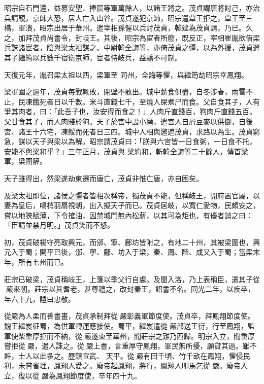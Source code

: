 \begin{pinyinscope}
 昭宗自石門還，益募安聖、捧宸等軍萬餘人，以諸王將之。茂貞謂唐將討己，亦治兵請覲，京師大恐，居人亡入山谷。茂貞遂犯京師，昭宗遣覃王拒之，覃王至三橋，軍潰，昭宗出居于華州。遣宰相孫偓以兵討茂貞，韓建為茂貞請，乃已。久之，加拜茂貞尚書令，封岐王。其後，昭宗為宦者所廢，既反正，宰相崔胤欲借梁兵誅諸宦者，陰與梁太祖謀之。中尉韓全誨等，亦倚茂貞之彊，以為外援，茂貞遣其子繼筠以兵數千宿衛京師，宦者恃岐兵，益驕不可制。



 天復元年，胤召梁太祖以西，梁軍至
 同州，全誨等懼，與繼筠劫昭宗幸鳳翔。



 梁軍圍之逾年，茂貞每戰輒敗，閉壁不敢出。城中薪食俱盡，自冬涉春，雨雪不止，民凍餓死者日以千數。米斗直錢七千，至燒人屎煮尸而食。父自食其子，人有爭其肉者，曰：「此吾子也，汝安得而食之！」人肉斤直錢百，狗肉斤直錢五百。父甘食其子，而人肉賤於狗。天子於宮中設小磨，遣宮人自屑豆麥以供御，自後宮、諸王十六宅，凍餒而死者日三四。城中人相與邀遮茂貞，求路以為生。茂貞窮急，謀以天子與梁以為解。昭宗謂茂貞曰：「朕與六宮皆一日食粥，一日食不托，安能不與梁和乎？」三年正月，茂貞與
 梁約和，斬韓全誨等二十餘人，傳首梁軍，梁圍解。



 天子雖得出，然梁遂劫東遷而唐亡，茂貞非惟亡唐，亦自困矣。



 及梁太祖即位，諸侯之彊者皆相次稱帝，獨茂貞不能，但稱岐王，開府置官屬，以妻為皇后，鳴梢羽扇視朝，出入擬天子而已。茂貞居岐，以寬仁愛物，民頗安之，嘗以地狹賦薄，下令搉油，因禁城門無內松薪，以其可為炬也，有優者誚之曰：「臣請並禁月明。」茂貞笑而不怒。



 初，茂貞破楊守亮取興元，而邠、寧、鄜坊皆附之，有地二十州，其被梁圍也，興元入于蜀；開平已後，邠、寧、鄜、坊入于梁，秦、鳳、階、成又入于蜀；當梁末年，所有七州而已。



 莊宗已破梁，茂貞稱岐王，上箋以季父行自處。及聞入洛，乃上表稱臣，遣其子從嚴來朝。莊宗以其耆老，甚尊禮之，改封秦王，詔書不名。同光二年，以疾卒，年六十九，謚曰忠敬。



 從嚴為人柔而善書畫，茂貞承制拜從嚴彰義軍節度使。茂貞卒，拜鳳翔節度使。魏王繼岌征蜀，為供軍轉運應接使。蜀平，繼岌遣從嚴部送王衍，行至鳳翔，監軍使柴重厚拒而不納，從嚴遂東至華州，聞莊宗之難乃西歸。明宗入立，聞重厚嘗拒從嚴，遣人誅之。從嚴上書，言重厚守鳳翔，軍民無所擾，願貸其過。雖不許，士人以此多之。歷鎮宣武、
 天平。從嚴有田千頃、竹千畝在鳳翔，懼侵民利，未嘗省理，鳳翔人愛之。廢帝起鳳翔，將行，鳳翔人叩馬乞從嚴。廢帝入立，復以從嚴為鳳翔節度使，卒年四十九。




\end{pinyinscope}
